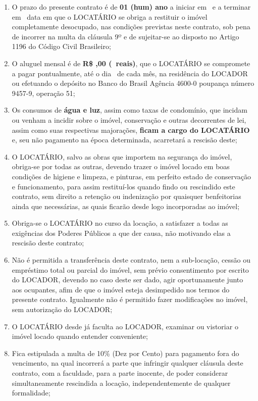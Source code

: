 \documentclass[a4paper,12pt]{article}
\begin{document}
\begin{enumerate}

\item O prazo do presente contrato é de \textbf{01 (hum) ano} a iniciar em \hrulefill
\ e a terminar em \makebox[6cm]{\hrulefill}\ data em que o LOCATÁRIO 
se obriga a restituir o imóvel completamente desocupado, nas condições previstas neste contrato,
sob pena de incorrer na multa da cláusula 9º e de sujeitar-se ao disposto no Artigo 1196 do Código Civil Brasileiro;
\item O aluguel mensal é de \textbf{R\$ \makebox[2cm]{\hrulefill},00 (\makebox[8cm]{\hrulefill}\ reais)},
que o LOCATÁRIO se compromete a pagar pontualmente, até o dia \makebox[4cm]{\hrulefill}\
de cada mês, na residência do LOCADOR ou efetuando o depósito no Banco do Brasil Agência 4600-0 poupança número 9457-9, operação 51; 
\item Os consumos de \textbf{água e luz}, assim como taxas de condomínio, que incidam ou venham a incidir sobre o imóvel, conservação e outras decorrentes de lei, assim como suas respectivas majorações, \textbf{ficam a cargo do LOCATÁRIO} e, seu não pagamento na época determinada, acarretará a rescisão deste; 
\item O LOCATÁRIO, salvo as obras que importem na segurança do imóvel, obriga-se por todas as outras, devendo trazer o imóvel locado em boas condições de higiene e limpeza, e pinturas, em perfeito estado de conservação e funcionamento, para assim restituí-los quando findo ou rescindido este contrato, sem direito a retenção ou indenização por quaisquer benfeitorias ainda que necessárias, as quais ficarão desde logo incorporadas ao imóvel; 
\item Obriga-se o LOCATÁRIO no curso da locação, a satisfazer a todas as exigências dos Poderes Públicos a que der causa, não motivando elas a rescisão deste contrato;  
\item Não é permitida a transferência deste contrato, nem a sub-locação, cessão ou empréstimo total ou parcial do imóvel, sem prévio consentimento por escrito do LOCADOR, devendo no caso deste ser dado, agir oportunamente junto aos ocupantes, afim de que o imóvel esteja desimpedido nos termos do presente contrato. Igualmente não é permitido fazer modificações no imóvel, sem autorização do LOCADOR;
\item O LOCATÁRIO desde já faculta ao LOCADOR, examinar ou vistoriar o imóvel locado quando entender conveniente;
\item Fica estipulada a multa de 10\% (Dez por Cento) para pagamento fora do vencimento, na qual incorrerá a parte que infringir qualquer cláusula deste contrato, com a faculdade, para a parte inocente, de poder considerar simultaneamente rescindida a locação, independentemente de qualquer formalidade;

\end{enumerate}
\end{document}
